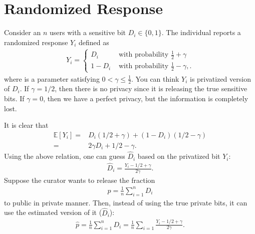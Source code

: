 \documentclass[11pt, a4paper]{article}
\begin{document}
\section{Randomized Response}
Consider an $n$ users with a sensitive bit $D_i\in\{0, 1\}$.
The individual reports a randomized response $Y_i$ defined as
\begin{align}
    Y_i = \begin{cases}
        D_i & \mbox{ with probability $\frac{1}{2}+\gamma$}\\
        1-D_i & \mbox{ with probability $\frac{1}{2}-\gamma$},.
    \end{cases}
\end{align}
where is a parameter satisfying $0<\gamma \leq \frac{1}{2}$.
You can think $Y_i$ is privatized version of $D_i$.
If $\gamma = 1/2$, then there is no privacy since it is releasing the true sensitive bits.
If $\gamma = 0$, then we have a perfect privacy, but the information is completely lost.

It is clear that 
\begin{align}
    \mathbb{E}[Y_i] =& D_i (1/2+\gamma) + (1-D_i) (1/2-\gamma) \\
    =& 2\gamma D_i + 1/2 - \gamma.
\end{align}
Using the above relation, one can guess $\hat{D}_i$ based on the privatized bit $Y_i$:
\begin{align}
    \hat{D}_i = \frac{Y_i - 1/2 + \gamma}{2\gamma}.
\end{align}
Suppose the curator wants to release the fraction 
\begin{align}
    p = \frac{1}{n}\sum_{i=1}^n D_i
\end{align}
to public in private manner.
Then, instead of using the true private bits, it can use the estimated version of it ($\hat{D}_i$):
\begin{align}
    \hat{p} = \frac{1}{n}\sum_{i=1}^n D_i = \frac{1}{n}\sum_{i=1}\frac{Y_i - 1/2 + \gamma}{2\gamma}.
\end{align}
\end{document}

